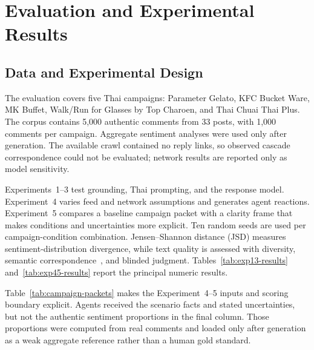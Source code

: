 \documentclass[conference]{IEEEtran}
\begin{document}
\section{Evaluation and Experimental Results}

\subsection{Data and Experimental Design}

The evaluation covers five Thai campaigns: Parameter Gelato, KFC Bucket Ware,
MK Buffet, Walk/Run for Glasses by Top Charoen, and Thai Chuai Thai Plus. The
corpus contains 5,000 authentic comments from 33 posts, with 1,000 comments per
campaign. Aggregate sentiment analyses were used only after generation. The
available crawl contained no reply links, so observed cascade correspondence
could not be evaluated; network results are reported only as model
sensitivity.

Experiments~1--3 test grounding, Thai prompting, and the response model.
Experiment~4 varies feed and network assumptions and generates agent reactions.
Experiment~5 compares a baseline campaign packet with a clarity frame that
makes conditions and uncertainties more explicit. Ten random seeds are used
per campaign-condition combination. Jensen--Shannon distance (JSD) measures
sentiment-distribution divergence, while text quality is assessed with
diversity, semantic correspondence~\cite{zhang2020bertscore}, and blinded
judgment. Tables~\ref{tab:exp13-results} and~\ref{tab:exp45-results} report the
principal numeric results.

Table~\ref{tab:campaign-packets} makes the Experiment~4--5 inputs and scoring
boundary explicit. Agents received the scenario facts and stated
uncertainties, but not the authentic sentiment proportions in the final
column. Those proportions were computed from real comments and loaded only
after generation as a weak aggregate reference rather than a human gold
standard.
\end{document}
